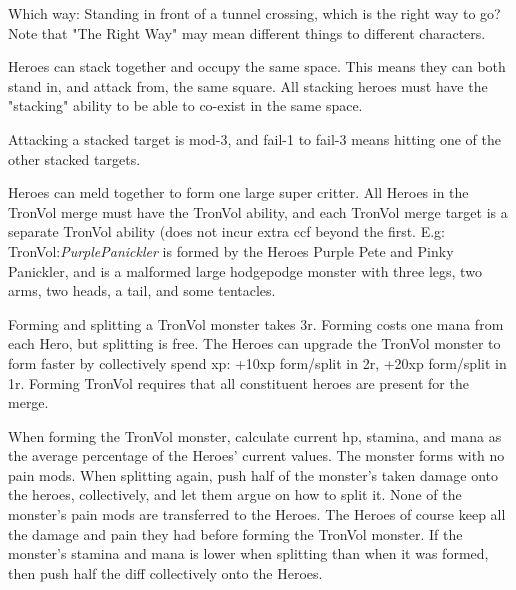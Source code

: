 Which way: Standing in front of a tunnel crossing, which is the right way to go? Note that "The Right Way" may mean different things to different characters.


 Heroes can stack together and occupy the same space. This means they can both stand in, and attack from, the same square. All stacking heroes must have the "stacking" ability to be able to co-exist in the same space.

Attacking a stacked target is mod-3, and fail-1 to fail-3 means hitting one of the other stacked targets.




 Heroes can meld together to form one large super critter. All Heroes in the TronVol merge must have the TronVol ability, and each TronVol merge target is a separate TronVol ability (does not incur extra ccf beyond the first.
E.g: TronVol:\emph{PurplePanickler} is formed by the Heroes Purple Pete and Pinky Panickler, and is a malformed large hodgepodge monster with three legs, two arms, two heads, a tail, and some tentacles.

Forming and splitting a TronVol monster takes 3r. Forming costs one mana from each Hero, but splitting is free. The Heroes can upgrade the TronVol monster to form faster by collectively spend xp: +10xp form/split in 2r, +20xp form/split in 1r.
Forming TronVol requires that all constituent heroes are present for the merge.

When forming the TronVol monster, calculate current hp, stamina, and mana as the average percentage of the Heroes' current values. The monster forms with no pain mods. When splitting again, push half of the monster's taken damage onto the heroes, collectively, and let them argue on how to split it. None of the monster's pain mods are transferred to the Heroes. The Heroes of course keep all the damage and pain they had before forming the TronVol monster. If the monster's stamina and mana is lower when splitting than when it was formed, then push half the diff collectively onto the Heroes.

